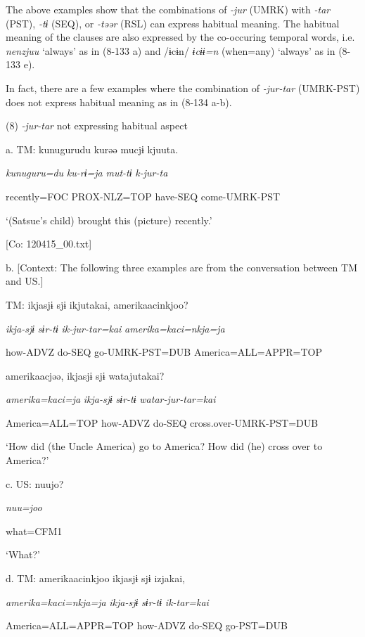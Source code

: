 The above examples show that the combinations of \textit{{}-jur} (UMRK) with \textit{{}-tar} (PST), \textit{{}-tɨ} (SEQ), or \textit{{}-təər} (RSL) can express habitual meaning. The habitual meaning of the clauses are also expressed by the co-occuring temporal words, i.e. \textit{nenzjuu} ‘always’ as in (8-133 a) and /ɨcɨn/ \textit{ɨcɨɨ=n} (when=any) ‘always’ as in (8-133 e).

  In fact, there are a few examples where the combination of \textit{{}-jur-tar} (UMRK-PST) does not express habitual meaning as in (8-134 a-b).

(8)  \textit{{}-jur-tar} not expressing habitual aspect

  a.  TM:  kunugurudu  kurəə  mucjɨ  kjuuta.

      \textit{kunuguru=du}  \textit{ku-rɨ=ja}  \textit{mut-tɨ}  \textit{k-jur-ta}

      recently=FOC  PROX-NLZ=TOP  have-SEQ  come-UMRK-PST

      ‘(Satsue’s child) brought this (picture) recently.’

      [Co: 120415\_00.txt]

  b.  [Context: The following three examples are from the conversation between TM and US.]

    TM:  ikjasjɨ  sjɨ  ikjutakai,  amerikaacinkjoo?

      \textit{ikja-sjɨ}  \textit{sɨr-tɨ}  \textit{ik-jur-tar=kai}  \textit{amerika=kaci=nkja=ja}

      how-ADVZ  do-SEQ  go-UMRK-PST=DUB  America=ALL=APPR=TOP

      amerikaacjəə,  ikjasjɨ  sjɨ  watajutakai?

      \textit{amerika=kaci=ja}  \textit{ikja-sjɨ}  \textit{sɨr-tɨ}  \textit{watar-jur-tar=kai}

      America=ALL=TOP  how-ADVZ  do-SEQ  cross.over-UMRK-PST=DUB

      ‘How did (the Uncle America) go to America? How did (he) cross over to America?’

  c.  US:  nuujo?

      \textit{nuu=joo}

      what=CFM1

      ‘What?’

  d.  TM:  amerikaacinkjoo  ikjasjɨ  sjɨ  izjakai,

      \textit{amerika=kaci=nkja=ja}  \textit{ikja-sjɨ}  \textit{sɨr-tɨ}  \textit{ik-tar=kai}

      America=ALL=APPR=TOP  how-ADVZ  do-SEQ  go-PST=DUB

